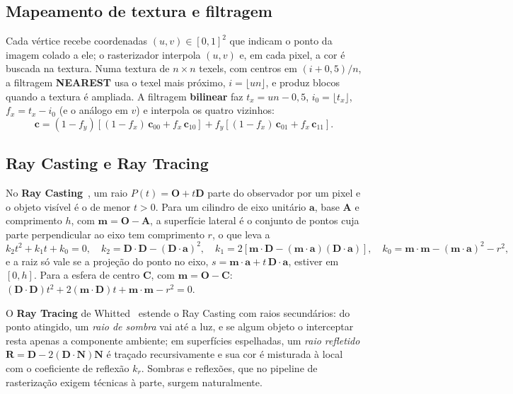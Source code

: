\documentclass[11pt, a4paper]{article}
\newcommand{\vetor}[1]{\mathbf{#1}}
\begin{document}
\subsection{Mapeamento de textura e filtragem}
Cada vértice recebe coordenadas $(u, v) \in [0,1]^2$ que indicam o ponto da imagem colado a ele; o rasterizador interpola $(u, v)$ e, em cada pixel, a cor é buscada na textura. Numa textura de $n \times n$ texels, com centros em $(i + 0{,}5)/n$, a filtragem \textbf{NEAREST} usa o texel mais próximo, $i = \lfloor u n \rfloor$, e produz blocos quando a textura é ampliada. A filtragem \textbf{bilinear} faz $t_x = u n - 0{,}5$, $i_0 = \lfloor t_x \rfloor$, $f_x = t_x - i_0$ (e o análogo em $v$) e interpola os quatro vizinhos:
\begin{equation}
  \vetor{c} = (1 - f_y)\left[(1 - f_x)\,\vetor{c}_{00} + f_x\,\vetor{c}_{10}\right] + f_y\left[(1 - f_x)\,\vetor{c}_{01} + f_x\,\vetor{c}_{11}\right].
  \label{eq:bilinear}
\end{equation}

\subsection{Ray Casting e Ray Tracing}
No \textbf{Ray Casting}~\cite{appel1968}, um raio $P(t) = \vetor{O} + t\vetor{D}$ parte do observador por um pixel e o objeto visível é o de menor $t > 0$. Para um cilindro de eixo unitário $\vetor{a}$, base $\vetor{A}$ e comprimento $h$, com $\vetor{m} = \vetor{O} - \vetor{A}$, a superfície lateral é o conjunto de pontos cuja parte perpendicular ao eixo tem comprimento $r$, o que leva a
\begin{equation}
  k_2 t^2 + k_1 t + k_0 = 0,\quad
  k_2 = \vetor{D}\cdot\vetor{D} - (\vetor{D}\cdot\vetor{a})^2,\quad
  k_1 = 2\left[\vetor{m}\cdot\vetor{D} - (\vetor{m}\cdot\vetor{a})(\vetor{D}\cdot\vetor{a})\right],\quad
  k_0 = \vetor{m}\cdot\vetor{m} - (\vetor{m}\cdot\vetor{a})^2 - r^2,
  \label{eq:cilindro}
\end{equation}
e a raiz só vale se a projeção do ponto no eixo, $s = \vetor{m}\cdot\vetor{a} + t\,\vetor{D}\cdot\vetor{a}$, estiver em $[0, h]$. Para a esfera de centro $\vetor{C}$, com $\vetor{m} = \vetor{O} - \vetor{C}$: $(\vetor{D}\cdot\vetor{D})t^2 + 2(\vetor{m}\cdot\vetor{D})t + \vetor{m}\cdot\vetor{m} - r^2 = 0$.

O \textbf{Ray Tracing} de Whitted~\cite{whitted1980} estende o Ray Casting com raios secundários: do ponto atingido, um \emph{raio de sombra} vai até a luz, e se algum objeto o interceptar resta apenas a componente ambiente; em superfícies espelhadas, um \emph{raio refletido} $\vetor{R} = \vetor{D} - 2(\vetor{D}\cdot\vetor{N})\vetor{N}$ é traçado recursivamente e sua cor é misturada à local com o coeficiente de reflexão $k_r$. Sombras e reflexões, que no pipeline de rasterização exigem técnicas à parte, surgem naturalmente.
\end{document}
